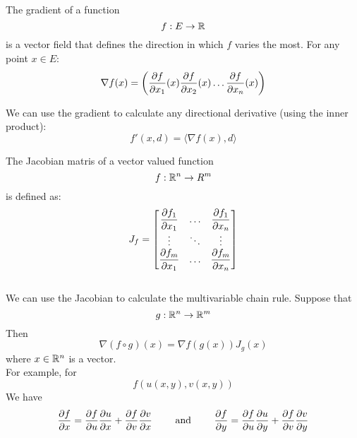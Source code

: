 \documentclass[12pt]{article}
\begin{document}
    The gradient of a function
    \[ f: E \to \mathbb{R} \]
    is a vector field
    that defines the direction in which
    $f$ varies the most.
    For any point $x \in E$:
    \[ \nabla f(x) =
    \left( \dfrac{\partial f}{\partial x_1}(x)
    \dfrac{\partial f}{\partial x_2}(x) 
    \dots \dfrac{\partial f}{\partial x_n}(x) \right) \]

    We can use the gradient to calculate any
    directional derivative (using the inner product):
    \[ f'(x, d) = \langle \nabla f(x), d \rangle \]

    The Jacobian matris of a vector valued function
    \[ f: \mathbb{R}^n \to R^m \]
    is defined as:
    \[   J_f =
        \begin{bmatrix} {\dfrac{\partial f_1}{\partial x_1}} &
            {\dots} &
            {\dfrac{\partial f_1}{\partial x_n}} \\
            {\vdots} & 
            {\ddots} &
            {\vdots} \\
            {\dfrac{\partial f_m}{\partial x_1}} &
            {\dots} &
            {\dfrac{\partial f_m}{\partial x_n}}
         \end{bmatrix}
    \] \\

    We can use the Jacobian to calculate
    the multivariable chain rule.
    Suppose that
    \[ g: \mathbb{R}^n \to \mathbb{R}^m \]
    Then
    \[ \nabla(f \circ g)(x) = \nabla f(g(x))J_g(x) \]
    where $x \in \mathbb{R}^n$ is a vector. \\ 
    For example, for 
    \[ f(u(x, y), v(x, y)) \]
    We have
    \[ \dfrac{\partial f}{\partial x} = \dfrac{\partial f}{\partial u}\dfrac{\partial u}{\partial x}
    + \dfrac{\partial f}{\partial v}\dfrac{\partial v}{\partial x} 
    \qquad \text{ and } \qquad   
    \dfrac{\partial f}{\partial y} = \dfrac{\partial f}{\partial u}\dfrac{\partial u}{\partial y}
    + \dfrac{\partial f}{\partial v}\dfrac{\partial v}{\partial y} 
    \]
\end{document}

